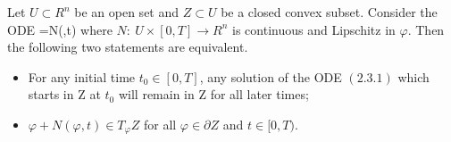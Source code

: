 \begin{lemma}
  \label{lem:cz-invariance-criterion-for-closed-convex-sets}
Let $U\subset R^n$ be an open set and $Z\subset U$ be a closed
convex subset. Consider the {\rm ODE} \be
{}=N(\varphi,t)%
\ee where $N:\ U\times[0,T]\rightarrow R^n$ is continuous and
Lipschitz in $\varphi$. Then the following two statements are
equivalent.
\begin{itemize}
\item[(i)] For any initial time $t_0\in[0,T]$, any solution of the
{\rm ODE} $(2.3.1)$ which starts in Z at $t_0$ will remain in Z
for all later times; \item[(ii)] $\varphi+N(\varphi,t)\in
T_\varphi Z$ for all $\varphi\in\partial Z$ and $t\in[0,T)$.
\end{itemize}
\end{lemma}

